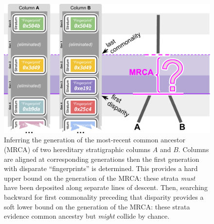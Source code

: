 \begin{figure}
    \includegraphics[width=\columnwidth]{img/column-comparison}
    \caption{
    Inferring the generation of the most-recent common ancestor (MRCA) of two hereditary stratigraphic columns $A$ and $B$.
    Columns are aligned at corresponding generations then the first generation with disparate ``fingerprints'' is determined.
    This provides a hard upper bound on the generation of the MRCA: these strata \textit{must} have been deposited along separate lines of descent.
    Then, searching backward for first commonality preceding that disparity provides a soft lower bound on the generation of the MRCA: these strata evidence common ancestry but \textit{might} collide by chance.
    }
  \label{fig:column-comparison}
\end{figure}

